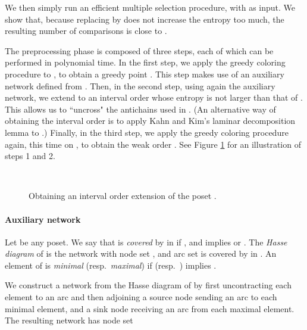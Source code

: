 \documentclass[12pt,oneside]{article}
\begin{document}
We then simply run an efficient multiple selection procedure, with  as input.
We show that, because replacing  by  does not increase the entropy too much, the resulting number of comparisons is close to .

The preprocessing phase is composed of three steps, each of which can be performed in polynomial time. In the first step, we apply the greedy coloring procedure to , to obtain a greedy point . This step makes use of an auxiliary network defined from . Then, in the second step, using again the auxiliary network, we extend  to an interval order  whose entropy is not larger than that of . This allows us to ``uncross" the antichains used in . (An alternative way of obtaining the interval order  is to apply Kahn and Kim's \cite{KK95} laminar decomposition lemma to .) Finally, in the third step, we apply the greedy coloring procedure again, this time on , to obtain the weak order . See Figure \ref{fig-weakextension} for an illustration of steps 1 and 2.

\begin{figure}
\begin{center}
\hskip 2.5cm
\\
\hskip 2cm
\end{center}
\caption{\label{fig-weakextension} Obtaining an interval order extension of the poset .}
\end{figure}

\paragraph{Auxiliary network}
Let  be any poset. We say that  is {\em covered\/} by  in  if ,  and  implies  or . The {\em Hasse diagram\/} of  is the network with node set , and arc set  is covered by  in . An element  of  is {\em minimal\/} (resp.\ {\em maximal\/}) if  (resp.\ ) implies .

We construct a network  from the Hasse diagram of  by first uncontracting each element  to an arc  and then adjoining a source node  sending an arc to each minimal element, and a sink node  receiving an arc from each maximal element. The resulting network has node set
\end{document}

